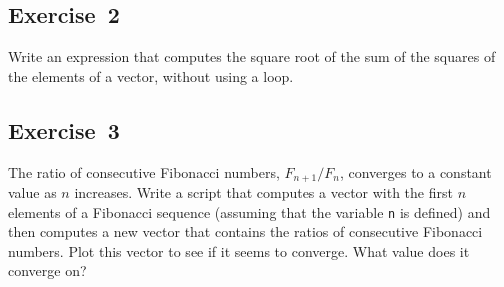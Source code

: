 \subsection{Exercise~2}
Write an expression that computes the square root of the sum of the squares of the elements of a vector, without using a loop.



\subsection{Exercise~3}
\label{fibratio}

The ratio of consecutive Fibonacci numbers, $F_{n+1}/F_{n}$, converges
to a constant value as $n$ increases.  Write a script that computes
a vector with the first $n$ elements of a Fibonacci sequence (assuming
that the variable \lstinline{n} is defined) and then computes a new
vector that contains the ratios of consecutive Fibonacci numbers.
Plot this vector to see if it seems to converge.  What value does
it converge on?




